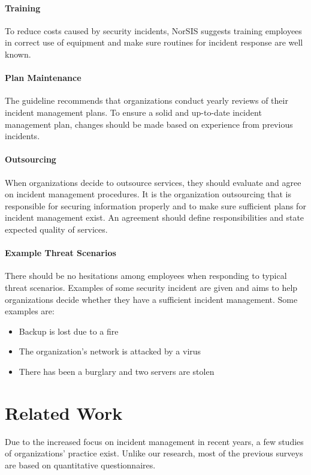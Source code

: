 \paragraph{Training}
To reduce costs caused by security incidents, NorSIS suggests training employees in correct use of equipment and make sure routines for incident response are well known.

\paragraph{Plan Maintenance}
The guideline recommends that organizations conduct yearly reviews of their incident management plans. To ensure a solid and up-to-date incident management plan, changes should be made based on experience from previous incidents. 

\paragraph{Outsourcing}
When organizations decide to outsource services, they should evaluate and agree on incident management procedures. It is the organization outsourcing that is responsible for securing information properly and to make sure sufficient plans for incident management exist. An agreement should define responsibilities and state expected quality of services. 

\paragraph{Example Threat Scenarios}
There should be no hesitations among employees when responding to typical threat scenarios. Examples of some security incident are given and aims to help organizations decide whether they have a sufficient incident management. Some examples are:
\begin{itemize}
\item Backup is lost due to a fire
\item The organization's network is attacked by a virus
\item There has been a burglary and two servers are stolen 
\end{itemize}



\section{Related Work}
Due to the increased focus on incident management in recent years, a few studies of organizations' practice exist. Unlike our research, most of the previous surveys are based on quantitative questionnaires.

